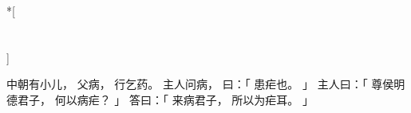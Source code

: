 
\switchcolumn[0]*[\section{}]

中朝有小儿，
父病，
行乞药。
主人问病，
曰：「
    患疟也。
」
主人曰：「
    尊侯明德君子，
    何以病疟？
」
答曰：「
    来病君子，
    所以为疟耳。
」

\switchcolumn


